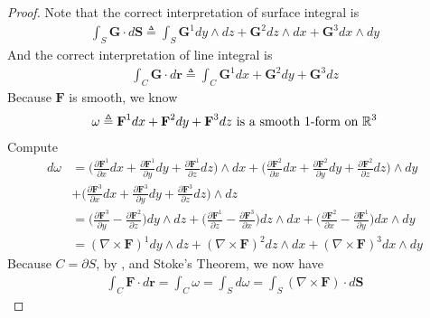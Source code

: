 \documentclass{report}
\begin{document}
\begin{proof}
Note that the correct interpretation of surface integral is 
\begin{align}
\label{cor1}
\int_S \textbf{G} \cdot d \textbf{S} \triangleq  \int_S \textbf{G}^1 dy\wedge  dz +  \textbf{G}^2 dz \wedge  dx + \textbf{G}^3 dx \wedge  dy   
\end{align}
And the correct interpretation of line integral is 
\begin{align}
\label{cor2}
\int_C \textbf{G} \cdot d \textbf{r}\triangleq  \int_C \textbf{G}^1 dx + \textbf{G}^2 dy + \textbf{G}^3 dz
\end{align}
Because $\textbf{F}$ is smooth, we know 
\begin{align*}
\omega \triangleq \textbf{F}^1 dx + \textbf{F}^2 dy + \textbf{F}^3 dz\text{ is a smooth 1-form on }\mathbb{R}^3
\end{align*}
Compute 
\begin{align*}
d\omega &= \Big( \frac{\partial \textbf{F}^1}{\partial x}dx + \frac{\partial \textbf{F}^1}{\partial y}dy + \frac{\partial \textbf{F}^1}{\partial z}dz \Big)\wedge  dx +   \Big( \frac{\partial \textbf{F}^2}{\partial x}dx + \frac{\partial \textbf{F}^2}{\partial y}dy + \frac{\partial \textbf{F}^2}{\partial z}dz \Big)\wedge  dy \\
& +  \Big( \frac{\partial \textbf{F}^3}{\partial x}dx + \frac{\partial \textbf{F}^3}{\partial y}dy + \frac{\partial \textbf{F}^3}{\partial z}dz \Big)\wedge  dz  \\
&=\Big( \frac{\partial \textbf{F}^3}{\partial y}- \frac{\partial \textbf{F}^2}{\partial z} \Big)dy \wedge  dz + \Big( \frac{\partial \textbf{F}^1}{\partial z}- \frac{\partial \textbf{F}^3}{\partial x}  \Big)dz \wedge  dx + \Big( \frac{\partial \textbf{F}^2}{\partial x}-\frac{\partial \textbf{F}^1}{\partial y}  \Big)dx \wedge  dy   \\
&= (\nabla \times \textbf{F})^1 dy \wedge  dz + (\nabla \times \textbf{F})^2 dz \wedge  dx +  (\nabla \times  \textbf{F})^3 dx \wedge  dy  
\end{align*}
Because $C= \partial S$, by ,  and Stoke's Theorem, we now have 
\begin{align*}
\int_{C} \textbf{F} \cdot d \textbf{r}= \int_C \omega = \int_{S} d\omega = \int_{S} (\nabla \times  \textbf{F}) \cdot d \textbf{S} 
\end{align*}
\end{proof}
\end{document}
